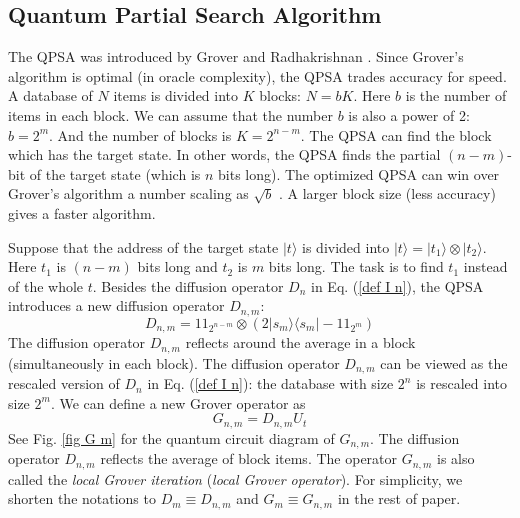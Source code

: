 \documentclass[%
 twocolumn,
 10pt,
 superscriptaddress,
 longbibliography,
 amsmath,amssymb,
 aps,
 pra,
floatfix,
]{revtex4-1}
\begin{document}
\subsection{\label{subsec:QPSA}Quantum Partial Search Algorithm}

The QPSA was introduced by Grover and Radhakrishnan \cite{GR05}. Since Grover's algorithm is optimal (in oracle complexity), the QPSA trades accuracy for speed. A database of $N$ items is divided into $K$ blocks: $N=bK$. Here $b$ is the number of items in each block. We can assume that the number $b$ is also a power of 2: $b=2^m$. And the number of blocks is $K=2^{n-m}$. The QPSA can find the block which has the target state. In other words, the QPSA finds the partial $(n-m)$-bit of the target state (which is $n$ bits long). The optimized QPSA can win over Grover's algorithm a number scaling as $\sqrt b$ \cite{GR05,Korepin05,KG06}. A larger block size (less accuracy) gives a faster algorithm.

Suppose that the address of the target state $|t\rangle$ is divided into $|t\rangle=|t_1\rangle\otimes|t_2\rangle$. Here $t_1$ is $(n-m)$ bits long and $t_2$ is $m$ bits long. The task is to find $t_1$ instead of the whole $t$. Besides the diffusion operator $D_n$ in Eq. (\ref{def I n}), the QPSA introduces a new diffusion operator $D_{n,m}$:
\begin{equation}
	\label{def I n m}
	D_{n,m} = 1\!\!1_{2^{n-m}}\otimes (2|s_m\rangle\langle s_m|-1\!\!1_{2^m})
\end{equation}
The diffusion operator $D_{n,m}$ reflects around the average in a block (simultaneously in each block). The diffusion operator $D_{n,m}$ can be viewed as the rescaled version of $D_n$ in Eq. (\ref{def I n}): the database with size $2^n$ is rescaled into size $2^{m}$. We can define a new Grover operator as
\begin{equation}
	\label{def G m}
	G_{n,m}=D_{n,m}U_t
\end{equation}
See Fig. \ref{fig G m} for the quantum circuit diagram of $G_{n,m}$. The diffusion operator $D_{n,m}$ reflects the average of block items. The operator $G_{n,m}$ is also called the {\it local Grover iteration} ({\it local Grover operator}). For simplicity, we shorten the notations to $D_{m}\equiv D_{n,m}$ and $G_{m}\equiv G_{n,m}$ in the rest of paper.
\end{document}
